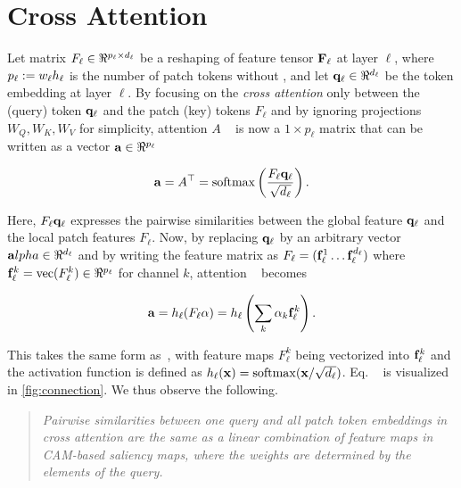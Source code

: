 \section {Cross Attention}
\label{sec:ca_defn}
Let matrix $F_\ell \in \real^{p_\ell \times d_\ell}$ be a reshaping of feature tensor $\mathbf{F}_\ell$ at
 layer $\ell$, where $p_\ell \mathrel{:=} w_\ell h_\ell$ is the number of patch tokens without \cls, and
  let $\vq_\ell \in \real^{d_\ell}$ be the \cls token embedding at layer $\ell$. By focusing on the 
  \emph{cross attention} only between the \cls (query) token $\mathbf{q}_\ell$ and the patch (key) tokens 
  $F_\ell$ and by ignoring projections $W_Q, W_K, W_V$ for simplicity, attention $A$ ~ 
  is now a $1 \times p_\ell$ matrix that can be written as a vector $\mathbf{a} \in \real^{p_\ell}$

\begin{equation}
	\mathbf{a} = A^\top = \operatorname{softmax} \left( \frac{F_\ell \mathbf{q}_\ell}{\sqrt{d_\ell}} \right).
\label{eq:cross-attention}
\end{equation}

\noindent Here, $F_\ell \mathbf{q}_\ell$ expresses the pairwise similarities between the global \cls feature 
$\mathbf{q}_\ell$ and the local patch features $F_\ell$. Now, by replacing $\mathbf{q}_\ell$ by an arbitrary vector 
$\mathbf{a}lpha \in \real^{d_\ell}$ and by writing the feature matrix as $F_\ell = (\mathbf{f}_\ell^1 \dots 
\mathbf{f}_\ell^{d_\ell})$ where $\vf_\ell^k = \vect(F_\ell^k) \in \real^{p_\ell}$ for channel $k$, 
attention ~ becomes

\begin{equation}
	\mathbf{a} = h_\ell (F_\ell \mathbf{\alpha}) =
		h_\ell \left( \sum_k \alpha_k \mathbf{f}_\ell^k \right).
\label{eq:connection}
\end{equation}

\noindent This takes the same form as~, with feature maps $F_\ell^k$ being vectorized into 
$\mathbf{f}_\ell^k$ and the activation function is defined as $h_\ell(\mathbf{x}) = \operatorname{softmax}(\mathbf{x} / \sqrt{d_\ell})$. 
Eq. ~ is visualized in \autoref{fig:connection}. We thus observe the following.

\begin{quote}
	\emph{Pairwise similarities between one query and all patch token embeddings in cross attention 
	are the same as a linear combination of feature maps in CAM-based saliency maps, where the 
	weights are determined by the elements of the query.}
\end{quote}

